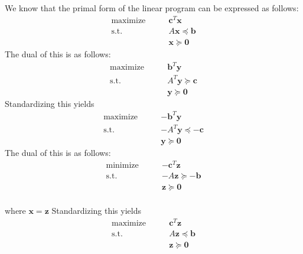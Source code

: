 \documentclass[letterpaper,12pt]{article}
\theoremstyle{definition}
\begin{document}
We know that the primal form of the linear program can be expressed as follows:
\begin{align*}
\underset{}{\text{maximize}} \qquad &\mathbf{c}^T \mathbf{x}\\
\text{s.t.} \qquad & A\textbf{x} \preceq \textbf{b}
\\& \mathbf{x} \succeq \mathbf{0}
\end{align*}
The dual of this is as follows:
\begin{align*}
\underset{}{\text{maximize}} \qquad &\textbf{b}^T \textbf{y}\\
\text{s.t.} \qquad & A^T\textbf{y} \succeq \mathbf{c}\\ &\textbf{y} \succeq \mathbf{0}
\end{align*}
Standardizing this yields
\begin{align*}
\underset{}{\text{maximize}} \qquad &-\textbf{b}^T \mathbf{y}\\
\text{s.t.} \qquad &-A^T \textbf{y} \preceq -\mathbf{c} \\ &\mathbf{y} \succeq \mathbf{0}
\end{align*}
The dual of this is as follows:
\begin{align*}
\underset{}{\text{minimize}} \qquad &-\mathbf{c}^T\textbf{z}\\
\text{s.t.} \qquad &-A\textbf{z} \succeq -\textbf{b}\\&\textbf{z} \succeq \mathbf{0}
\end{align*}
\\ where $\mathbf{x} = \mathbf{z}$
Standardizing this yields
\begin{align*}
\underset{}{\text{maximize}} \qquad &\mathbf{c}^T \textbf{z}\\
\text{s.t.}\qquad &A\textbf{z} \preceq \textbf{b}
\\\qquad &\mathbf{z} \succeq \mathbf{0}
\end{align*}
\end{document}
